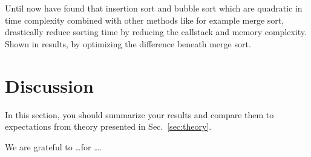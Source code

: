 \documentclass[sigconf, nonacm, natbib, screen, balance=False]{acmart}
\begin{document}
Until now have found that insertion sort and bubble sort which are quadratic in time complexity combined with other methods like for example merge sort, drastically reduce sorting time by reducing the callstack and memory complexity. Shown in results, by optimizing the difference beneath merge sort.

\section{Discussion}\label{sec:discussion}

In this section, you should summarize your results and compare them to
expectations from theory presented in Sec.~\ref{sec:theory}.

\begin{acks}
We are grateful to \dots for \dots.
\end{acks}






\end{document}
